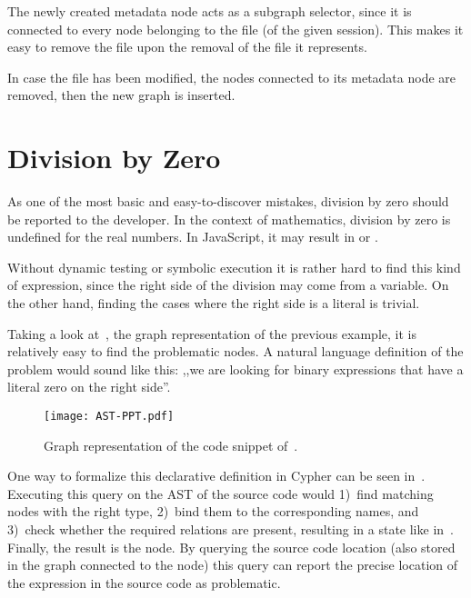 The newly created metadata node acts as a subgraph selector, since it is connected to every node belonging to the file (of the given session). This makes it easy to remove the file upon the removal of the file it represents.

In case the file has been modified, the nodes connected to its metadata node are removed, then the new graph is inserted.


\section{Division by Zero}
\label{sect:division-by-zero}
As one of the most basic and easy-to-discover mistakes, division by zero should be reported to the developer. In the context of mathematics, division by zero is undefined for the real numbers. In JavaScript, it may result in  or .

Without dynamic testing or symbolic execution it is rather hard to find this kind of expression, since the right side of the division may come from a variable. On the other hand, finding the cases where the right side is a literal is trivial.

Taking a look at~, the graph representation of the previous example, it is relatively easy to find the problematic nodes. A natural language definition of the problem would sound like this: ,,we are looking for binary expressions that have a literal zero on the right side''.

\begin{figure}[!htb]
  \centering
  \texttt{[image: AST-PPT.pdf]}
  \caption{Graph representation of the code snippet of~.}
  \label{fig:AST-PPT}
\end{figure}

One way to formalize this declarative definition in Cypher can be seen in~. Executing this query on the AST of the source code would 1)~find matching nodes with the right type, 2)~bind them to the corresponding names, and 3)~check whether the required relations are present, resulting in a state like in~. Finally, the result is the  node. By querying the source code location (also stored in the graph connected to the node) this query can report the precise location of the expression in the source code as problematic.

\begin{figure}[!htb]
	\begin{minipage}{\textwidth}
		
	\end{minipage}
\end{figure}

